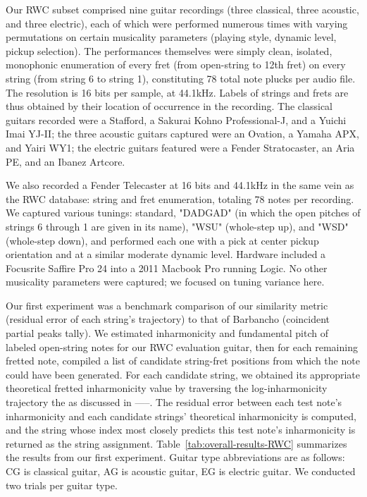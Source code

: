 \documentclass[12pt]{cmuthesis}
\begin{document}
Our RWC subset comprised nine guitar recordings (three classical, three acoustic, and three electric), each of which were performed numerous times with varying permutations on certain musicality parameters (playing style, dynamic level, pickup selection). The performances themselves were simply clean, isolated, monophonic enumeration of every fret (from open-string to 12th fret) on every string (from string 6 to string 1), constituting 78 total note plucks per audio file. The resolution is 16 bits per sample, at 44.1kHz. Labels of strings and frets are thus obtained by their location of occurrence in the recording. The classical guitars recorded were a Stafford, a Sakurai Kohno Professional-J, and a Yuichi Imai YJ-II; the three acoustic guitars captured were an Ovation, a Yamaha APX, and Yairi WY1; the electric guitars featured were a Fender Stratocaster, an Aria PE, and an Ibanez Artcore.


We also recorded a Fender Telecaster at 16 bits and 44.1kHz in the same vein as the RWC database: string and fret enumeration, totaling 78 notes per recording. We captured various tunings: standard, "DADGAD" (in which the open pitches of strings 6 through 1 are given in its name), "WSU" (whole-step up), and "WSD" (whole-step down), and performed each one with a pick at center pickup orientation and at a similar moderate dynamic level. Hardware included a Focusrite Saffire Pro 24 into a 2011 Macbook Pro running Logic. No other musicality parameters were captured; we focused on tuning variance here.

Our first experiment was a benchmark comparison of our similarity metric (residual error of each string's trajectory) to that of Barbancho (coincident partial peaks tally). We estimated inharmonicity and fundamental pitch of labeled open-string notes for our RWC evaluation guitar, then for each remaining fretted note, compiled a list of candidate string-fret positions from which the note could have been generated. For each candidate string, we obtained its appropriate theoretical fretted inharmonicity value by traversing the log-inharmonicity trajectory the as discussed in -----. The residual error between each test note's inharmonicity and each candidate strings' theoretical inharmonicity is computed, and the string whose index most closely predicts this test note's inharmonicity is returned as the string assignment. Table~\ref{tab:overall-results-RWC} summarizes the results from our first experiment. Guitar type abbreviations are as follows: CG is classical guitar, AG is acoustic guitar, EG is electric guitar. We conducted two trials per guitar type.
\end{document}
